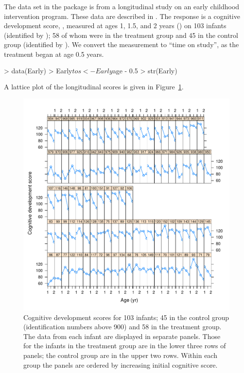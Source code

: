 \documentclass[12pt]{article}
\begin{document}
The  data set in the  package is from a
longitudinal study on an early childhood intervention program.  These
data are described in \citet[ch.~3]{Sing:Will:2003}.  The response is
a cognitive development score, , measured at ages 1, 1.5,
and 2 years () on 103 infants (identified by ); 58
of whom were in the treatment group and 45 in the control group
(identified by ).  We convert the  measurement to
``time on study'',  as the treatment began at age 0.5 years.
\begin{Schunk}
\begin{Sinput}
> data(Early)
> Early$tos <- Early$age - 0.5
> str(Early)
\end{Sinput}
\end{Schunk}
A lattice plot of the longitudinal scores is given in Figure~\ref{fig:EarlyData}.
\begin{figure}[tbp]
  \centering
  \includegraphics[width=\textwidth]{figs/Example-EarlyData}
  \caption[Cognitive development scores]{Cognitive development scores
    for 103 infants; 45 in the control group (identification numbers
    above 900) and 58 in the treatment group. The data from 
    each infant are displayed in separate panels. Those for the
    infants in the treatment group are in the lower three rows of
    panels; the control group are in the upper two rows.  Within each
    group the panels are ordered by increasing initial cognitive
    score.}
  \label{fig:EarlyData}
\end{figure}
\end{document}
